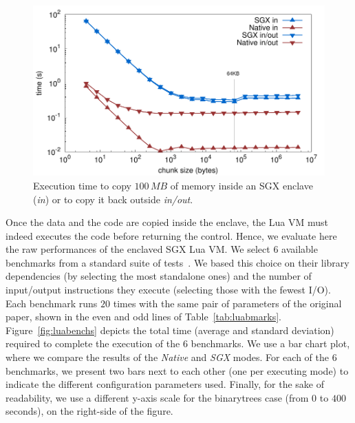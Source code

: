 \begin{figure}[t!]
  \centering
  \includegraphics[width=\linewidth]{plots/memcpy/memcpy}
  \caption{Execution time to copy $100\,MB$ of memory inside an SGX enclave (\emph{in}) or to copy it back outside {\emph{in/out}.} }
  \label{fig:sgxmemcpy}
\end{figure}

Once the data and the code are copied inside the enclave, the Lua VM must indeed executes the code before returning the control.
Hence, we evaluate here the raw performances of the enclaved SGX Lua VM.
We select $6$ available benchmarks from a standard suite of tests~\cite{bolz2015}.
We based this choice on their library dependencies (by selecting the most standalone ones) and the number of input/output instructions they execute (selecting those with the fewest I/O).
Each benchmark runs $20$ times with the same pair of parameters of the original paper, shown in the even and odd lines of Table~\ref{tab:luabmarks}.
Figure~\ref{fig:luabenchs} depicts the total time (average and standard deviation) required to complete the execution of the 6 benchmarks.
We use a bar chart plot, where we compare the results of the \emph{Native} and \emph{SGX} modes.
For each of the $6$ benchmarks, we present two bars next to each other (one per executing mode) to indicate the different configuration parameters used.
Finally, for the sake of readability, we use a different y-axis scale for the \textsf{binarytrees} case (from $0$ to $400$\,seconds), on the right-side of the figure.

